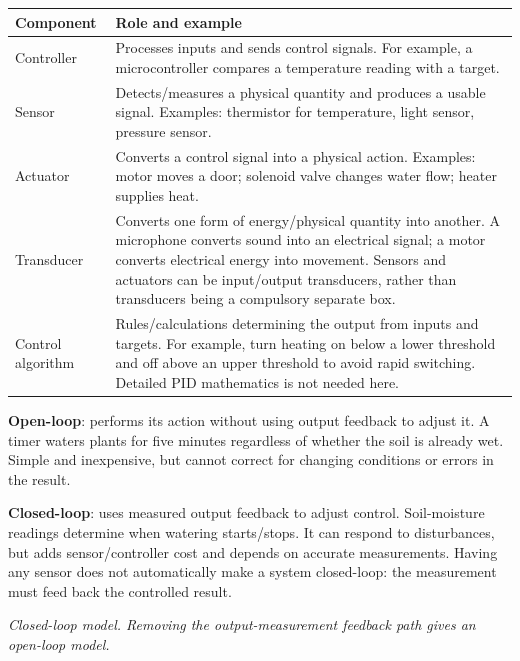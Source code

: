 \documentclass[a4paper,12pt]{article}
\begin{document}
\begin{center}
\begin{tabularx}{0.98\linewidth}{p{2.7cm} X}
\toprule
\textbf{Component} & \textbf{Role and example} \\
\midrule
Controller & Processes inputs and sends control signals. For example, a microcontroller compares a temperature reading with a target. \\
Sensor & Detects/measures a physical quantity and produces a usable signal. Examples: thermistor for temperature, light sensor, pressure sensor. \\
Actuator & Converts a control signal into a physical action. Examples: motor moves a door; solenoid valve changes water flow; heater supplies heat. \\
Transducer & Converts one form of energy/physical quantity into another. A microphone converts sound into an electrical signal; a motor converts electrical energy into movement. Sensors and actuators can be input/output transducers, rather than transducers being a compulsory separate box. \\
Control algorithm & Rules/calculations determining the output from inputs and targets. For example, turn heating on below a lower threshold and off above an upper threshold to avoid rapid switching. Detailed PID mathematics is not needed here. \\
\bottomrule
\end{tabularx}
\end{center}
\textbf{Open-loop}: performs its action without using output feedback to adjust it. A timer waters plants for five minutes regardless of whether the soil is already wet. Simple and inexpensive, but cannot correct for changing conditions or errors in the result.

\textbf{Closed-loop}: uses measured output feedback to adjust control. Soil-moisture readings determine when watering starts/stops. It can respond to disturbances, but adds sensor/controller cost and depends on accurate measurements. Having any sensor does not automatically make a system closed-loop: the measurement must feed back the controlled result.
\begin{center}
\end{center}
\textit{Closed-loop model. Removing the output-measurement feedback path gives an open-loop model.}
\end{document}
